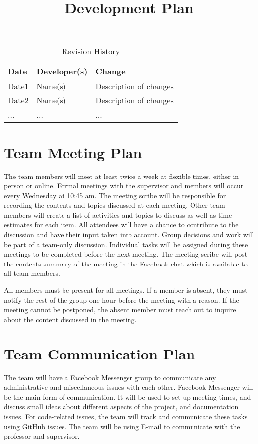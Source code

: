 \documentclass{article}
\title{Development Plan\\\progname}
\author{\authname}
\date{}
\begin{document}
\begin{table}[hp]
\caption{Revision History} \label{TblRevisionHistory}
\begin{tabularx}{\textwidth}{llX}
\toprule
\textbf{Date} & \textbf{Developer(s)} & \textbf{Change}\\
\midrule
Date1 & Name(s) & Description of changes\\
Date2 & Name(s) & Description of changes\\
... & ... & ...\\
\bottomrule
\end{tabularx}
\end{table}

\newpage

\maketitle


\section{Team Meeting Plan}
The team members will meet at least twice a week at flexible times, either in person or online. Formal meetings with the supervisor and members will occur every Wednesday at 10:45 am. The meeting scribe will be responsible for recording the contents and topics discussed at each meeting. Other team members will create a list of activities and topics to discuss as well as time estimates for each item. All attendees will have a chance to contribute to the discussion and have their input taken into account. Group decisions and work will be part of a team-only discussion. Individual tasks will be assigned during these meetings to be completed before the next meeting. The meeting scribe will post the contents summary of the meeting in the Facebook chat which is available to all team members.

All members must be present for all meetings. If a member is absent, they must notify the rest of the group one hour before the meeting with a reason. If the meeting cannot be postponed, the absent member must reach out to inquire about the content discussed in the meeting.

\section{Team Communication Plan}
The team will have a Facebook Messenger group to communicate any administrative and miscellaneous issues with each other. Facebook Messenger will be the main form of communication. It will be used to set up meeting times, and discuss small ideas about different aspects of the project, and documentation issues. For code-related issues, the team will track and communicate these tasks using GitHub issues. The team will be using E-mail to communicate with the professor and supervisor.
\end{document}
